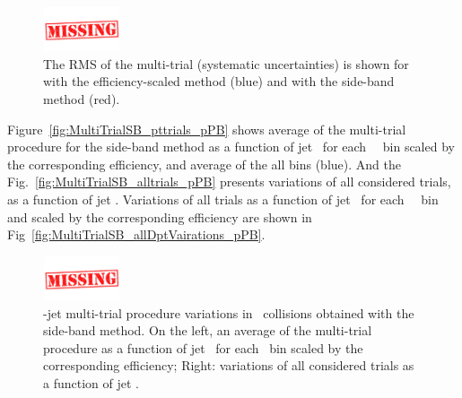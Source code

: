\begin{figure}[bth]
\begin{center}
\includegraphics[width=0.2\textwidth]{missing}
\caption{The RMS of the multi-trial (systematic uncertainties) is shown for with the efficiency-scaled method (blue) and with the side-band method (red).} 
\label{fig:MultiTrialRMS_pPB}
\end{center}
\end{figure}

Figure~\ref{fig:MultiTrialSB_pttrials_pPB} shows average of the multi-trial procedure for the side-band method as a function of jet \pt\ for each \Dstar\ \pt\ bin scaled by the corresponding efficiency, and average of the all \Dstar \pt bins (blue). And the Fig.~\ref{fig:MultiTrialSB_alltrials_pPB} presents variations of all considered trials, as a function of jet \pt .
Variations of all trials as a function of jet \pt\ for each \Dstar\ \pt\ bin and scaled by the corresponding efficiency are shown in Fig~\ref{fig:MultiTrialSB_allDptVairations_pPB}.

\begin{figure}[bth]
\begin{center}
\includegraphics[width=0.2\textwidth]{missing}
\caption{\Dstar-jet multi-trial procedure variations in \pPb\ collisions obtained with  the side-band method.
On the left, an average of the multi-trial procedure as a function of jet \pt\ for each \Dstar\ \pt bin scaled by the corresponding efficiency; Right: variations of all considered trials as a function of jet \pt .} 
\label{fig:MultiTrialSB_trials_pPB}
\end{center}
\end{figure}

